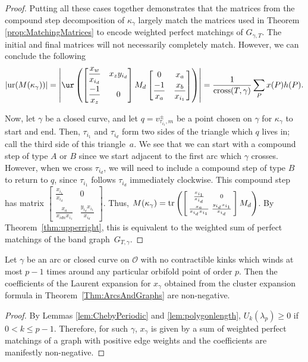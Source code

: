 \begin{proof}
Putting all these cases together demonstrates that the matrices from the compound step decomposition of $\kappa_\gamma$ largely match the matrices used in Theorem \ref{prop:MatchingMatrices} to encode weighted perfect matchings of $G_{\gamma, T}$. The initial and final matrices will not necessarily completely match. However, we can conclude the following \[\vert {\rm ur}(M(\kappa_\gamma)) \vert = \left| \ur\left( \begin{bmatrix} \dfrac{x_w}{x_{i_d}} & x_z y_{i_d} \vspace{1mm}\\ \dfrac{-1}{x_z} & 0 \end{bmatrix} M_d \begin{bmatrix} 0 & x_a \vspace{1mm}\\ \dfrac{-1}{x_a} & \dfrac{x_b}{x_{i_1}} \end{bmatrix} \right) \right| =\frac{1}{{\rm cross}(T,\gamma)} \sum_P x(P) h(P).
\]

Now, let $\gamma$ be a closed curve, and let $q = v_{\tau_{i_1},m}^\pm$ be a point chosen on $\gamma$ for $\kappa_\gamma$ to start and end. Then, $\tau_{i_1}$ and $\tau_{i_d}$ form two sides of the triangle which $q$ lives in; call the third side of this triangle~$a$. We see that we can start with a compound step of type $A$ or $B$ since we start adjacent to the first arc which $\gamma$ crosses. However, when we cross $\tau_{i_d}$, we will need to include a compound step of type $B$ to return to $q$, since $\tau_{i_1}$ follows $\tau_{i_d}$ immediately clockwise. This compound step has matrix $\left[\begin{smallmatrix} \frac{x_{i_1}}{x_{i_d}}& 0 \\ \frac{x_{a}}{x_{idn}x_{i_{1}}} & \frac{y_{i_d}x_{i_1}}{x_{i_d}} \end{smallmatrix}\right]$. Thus, $M(\kappa_\gamma) = {\rm tr}\left(\left[\begin{smallmatrix} \frac{x_{i_1}}{x_{i_d}}& 0 \\ \frac{x_{a}}{x_{i_d}x_{i_{1}}} & \frac{y_{i_d}x_{i_1}}{x_{i_d}} \end{smallmatrix}\right] M_d \right)$. By Theorem~\ref{thm:upperright}, this is equivalent to the weighted sum of perfect matchings of the band graph~$G_{T,\gamma}$.
\end{proof}

\begin{Corollary}
Let $\gamma$ be an arc or closed curve on $\mathcal{O}$ with no contractible kinks which winds at most $p-1$ times around any particular orbifold point of order $p$. Then the coefficients of the Laurent expansion for $x_{\gamma}$ obtained from the cluster expansion formula in Theorem~{\rm \ref{Thm:ArcsAndGraphs}} are non-negative.
\end{Corollary}

\begin{proof}
By Lemmas \ref{lem:ChebyPeriodic} and \ref{lem:polygonlength}, $U_k(\lambda_p) \geq 0$ if $0 < k \leq p-1$. Therefore, for such $\gamma$, $x_\gamma$ is given by a sum of weighted perfect matchings of a graph with positive edge weights and the coefficients are manifestly non-negative.
\end{proof}

